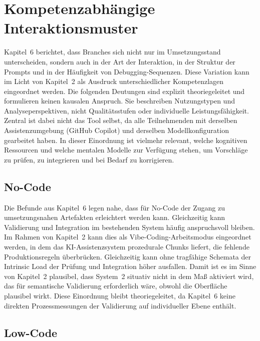 \section{Kompetenzabhängige Interaktionsmuster}
\label{sec:discussion_competence_patterns}

Kapitel~6 berichtet, dass Branches sich nicht nur im Umsetzungsstand unterscheiden, sondern auch in der Art der Interaktion, in der Struktur der Prompts und in der Häufigkeit von Debugging-Sequenzen.
Diese Variation kann im Licht von Kapitel~2 als Ausdruck unterschiedlicher Kompetenzlagen eingeordnet werden.
Die folgenden Deutungen sind explizit theoriegeleitet und formulieren keinen kausalen Anspruch.
Sie beschreiben Nutzungstypen und Analyseperspektiven, nicht Qualitätsstufen oder individuelle Leistungsfähigkeit.
Zentral ist dabei nicht das Tool selbst, da alle Teilnehmenden mit derselben Assistenzumgebung (GitHub Copilot) und derselben Modellkonfiguration gearbeitet haben.
In dieser Einordnung ist vielmehr relevant, welche kognitiven Ressourcen und welche mentalen Modelle zur Verfügung stehen, um Vorschläge zu prüfen, zu integrieren und bei Bedarf zu korrigieren.

\subsection{No-Code}
\label{sec:discussion_no_code}

Die Befunde aus Kapitel~6 legen nahe, dass für No-Code der Zugang zu umsetzungsnahen Artefakten erleichtert werden kann.
Gleichzeitig kann Validierung und Integration im bestehenden System häufig anspruchsvoll bleiben.
Im Rahmen von Kapitel~2 kann dies als Vibe-Coding-Arbeitsmodus eingeordnet werden, in dem das KI-Assistenzsystem prozedurale Chunks liefert, die fehlende Produktionsregeln überbrücken.
Gleichzeitig kann ohne tragfähige Schemata der Intrinsic Load der Prüfung und Integration höher ausfallen.
Damit ist es im Sinne von Kapitel~2 plausibel, dass System~2 situativ nicht in dem Maß aktiviert wird, das für semantische Validierung erforderlich wäre, obwohl die Oberfläche plausibel wirkt.
Diese Einordnung bleibt theoriegeleitet, da Kapitel~6 keine direkten Prozessmessungen der Validierung auf individueller Ebene enthält.

\subsection{Low-Code}
\label{sec:discussion_low_code}

